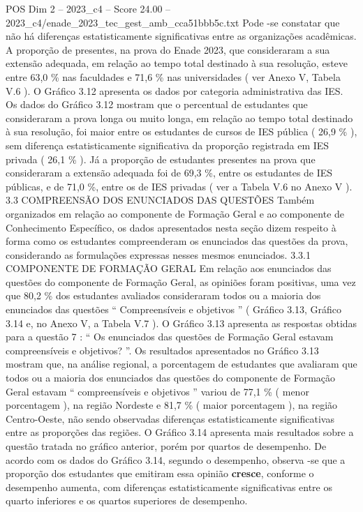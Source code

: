 \begin{textsample}{POS Dim 2 – 2023\_c4 – Score 24.00 – 2023\_c4/enade\_2023\_tec\_gest\_amb\_cca51bbb5c.txt}
Pode -se constatar que não há diferenças estatisticamente significativas entre as organizações acadêmicas.
A proporção de presentes, na prova do Enade 2023, que consideraram a sua extensão adequada, em relação ao tempo total destinado à sua resolução, esteve entre 63,0 \% nas faculdades e 71,6 \% nas universidades ( ver Anexo V, Tabela V.6 ).
O Gráfico 3.12 apresenta os dados por categoria administrativa das IES.
Os dados do Gráfico 3.12 mostram que o percentual de estudantes que consideraram a prova longa ou muito longa, em relação ao tempo total destinado à sua resolução, foi maior entre os estudantes de cursos de IES pública ( 26,9 \% ), sem diferença estatisticamente significativa da proporção registrada em IES privada ( 26,1 \% ).
Já a proporção de estudantes presentes na prova que consideraram a extensão adequada foi de 69,3 \%, entre os estudantes de IES públicas, e de 71,0 \%, entre os de IES privadas ( ver a Tabela V.6 no Anexo V ). 3.3 COMPREENSÃO DOS ENUNCIADOS DAS QUESTÕES Também organizados em relação ao componente de Formação Geral e ao componente de Conhecimento Específico, os dados apresentados nesta seção dizem respeito à forma como os estudantes compreenderam os enunciados das questões da prova, considerando as formulações expressas nesses mesmos enunciados. 3.3.1 COMPONENTE DE FORMAÇÃO GERAL Em relação aos enunciados das questões do componente de Formação Geral, as opiniões foram positivas, uma vez que 80,2 \% dos estudantes avaliados consideraram todos ou a maioria dos enunciados das questões “ Compreensíveis e objetivos ” ( Gráfico 3.13, Gráfico 3.14 e, no Anexo V, a Tabela V.7 ).
O Gráfico 3.13 apresenta as respostas obtidas para a questão 7 : “ Os enunciados das questões de Formação Geral estavam compreensíveis e objetivos? ”.
Os resultados apresentados no Gráfico 3.13 mostram que, na análise regional, a porcentagem de estudantes que avaliaram que todos ou a maioria dos enunciados das questões do componente de Formação Geral estavam “ compreensíveis e objetivos ” variou de 77,1 \% ( menor porcentagem ), na região Nordeste e 81,7 \% ( maior porcentagem ), na região Centro-Oeste, não sendo observadas diferenças estatisticamente significativas entre as proporções das regiões.
O Gráfico 3.14 apresenta mais resultados sobre a questão tratada no gráfico anterior, porém por quartos de desempenho.
De acordo com os dados do Gráfico 3.14, segundo o desempenho, observa -se que a proporção dos estudantes que emitiram essa opinião \textbf{cresce}, conforme o desempenho aumenta, com diferenças estatisticamente significativas entre os quarto inferiores e os quartos superiores de desempenho.

\end{textsample}
